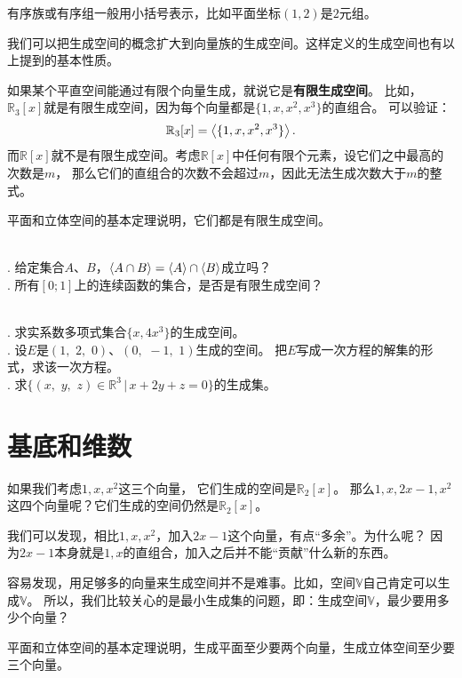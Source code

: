 \documentclass[12pt,UTF8]{ctexbook}
\begin{document}
有序族或有序组一般用小括号表示，比如平面坐标$(1,2)$是$2$元组。

我们可以把生成空间的概念扩大到向量族的生成空间。这样定义的生成空间也有以上提到的基本性质。

如果某个平直空间能通过有限个向量生成，就说它是\textbf{有限生成空间}。
比如，$\mathbb{R}_3[x]$就是有限生成空间，因为每个向量都是$\{1, x, x^2, x^3\}$的直组合。
可以验证：
$$\mathbb{R}_3[x] = \left\langle \{1, x, x^2, x^3\} \right\rangle.$$
而$\mathbb{R}[x]$就不是有限生成空间。考虑$\mathbb{R}[x]$中任何有限个元素，设它们之中最高的次数是$m$，
那么它们的直组合的次数不会超过$m$，因此无法生成次数大于$m$的整式。

平面和立体空间的基本定理说明，它们都是有限生成空间。

\begin{sk}
    \mbox{} \\
    . 给定集合$A$、$B$，$\left\langle A\cap B \right\rangle = \left\langle A \right\rangle\cap\left\langle B \right\rangle$成立吗？\\
    . 所有$[0;1]$上的连续函数的集合，是否是有限生成空间？
\end{sk}

\begin{xt}
    \mbox{} \\
    . 求实系数多项式集合$\{x, 4x^3\}$的生成空间。\\
    . 设$E$是$(1, \,\,2, \,\,0)$、$(0, \,\,-1, \,\,1)$生成的空间。
    把$E$写成一次方程的解集的形式，求该一次方程。\\
    . 求$\{(x,\,\,y,\,\,z)\in\mathbb{R}^3 \, | \, x + 2y + z = 0 \}$的生成集。
    
\end{xt}

\section{基底和维数}

如果我们考虑$1,x,x^2$这三个向量，
它们生成的空间是$\mathbb{R}_2[x]$。
那么$1,x,2x-1,x^2$这四个向量呢？它们生成的空间仍然是$\mathbb{R}_2[x]$。

我们可以发现，相比$1,x,x^2$，加入$2x-1$这个向量，有点“多余”。为什么呢？
因为$2x-1$本身就是$1, x$的直组合，加入之后并不能“贡献”什么新的东西。

容易发现，用足够多的向量来生成空间并不是难事。比如，空间$\mathbb{V}$自己肯定可以生成$\mathbb{V}$。
所以，我们比较关心的是最小生成集的问题，即：生成空间$\mathbb{V}$，最少要用多少个向量？

平面和立体空间的基本定理说明，生成平面至少要两个向量，生成立体空间至少要三个向量。
\end{document}
